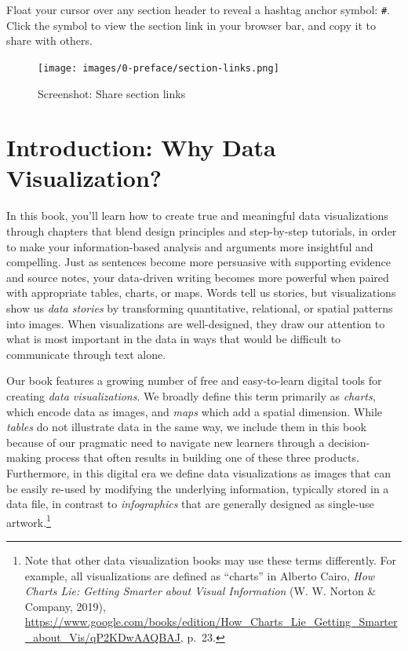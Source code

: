 \documentclass[
  english,
]{book}
\begin{document}
Float your cursor over any section header to reveal a hashtag anchor symbol: \texttt{\#}. Click the symbol to view the section link in your browser bar, and copy it to share with others.

\begin{figure}
\centering
\texttt{[image: images/0-preface/section-links.png]}
\caption{Screenshot: Share section links}
\end{figure}

\hypertarget{introduction}{%
\chapter*{Introduction: Why Data Visualization?}\label{introduction}}

In this book, you'll learn how to create true and meaningful data visualizations through chapters that blend design principles and step-by-step tutorials, in order to make your information-based analysis and arguments more insightful and compelling. Just as sentences become more persuasive with supporting evidence and source notes, your data-driven writing becomes more powerful when paired with appropriate tables, charts, or maps. Words tell us stories, but visualizations show us \emph{data stories} by transforming quantitative, relational, or spatial patterns into images. When visualizations are well-designed, they draw our attention to what is most important in the data in ways that would be difficult to communicate through text alone.

Our book features a growing number of free and easy-to-learn digital tools for creating \emph{data visualizations}. We broadly define this term primarily as \emph{charts}, which encode data as images, and \emph{maps} which add a spatial dimension. While \emph{tables} do not illustrate data in the same way, we include them in this book because of our pragmatic need to navigate new learners through a decision-making process that often results in building one of these three products. Furthermore, in this digital era we define data visualizations as images that can be easily re-used by modifying the underlying information, typically stored in a data file, in contrast to \emph{infographics} that are generally designed as single-use artwork.\footnote{Note that other data visualization books may use these terms differently. For example, all visualizations are defined as ``charts'' in Alberto Cairo, \emph{How {Charts Lie}: {Getting Smarter} about {Visual Information}} ({W. W. Norton \& Company}, 2019), \url{https://www.google.com/books/edition/How_Charts_Lie_Getting_Smarter_about_Vis/qP2KDwAAQBAJ}, p.~23.}
\end{document}
